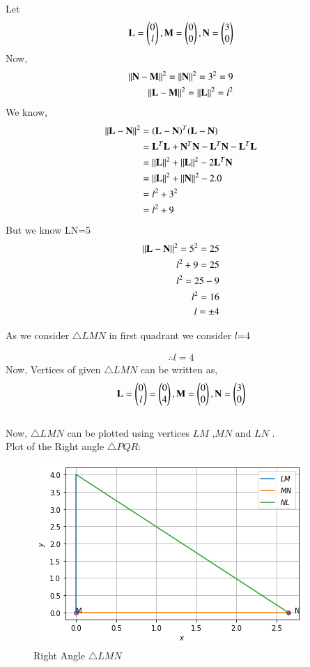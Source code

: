 \documentclass[journal,12pt,twocolumn]{IEEEtran}
\begin{document}
Let
\begin{align}
\textbf{L}=\begin{pmatrix}0 \\ l\end{pmatrix},
\textbf{M}=\begin{pmatrix}0 \\ 0\end{pmatrix} ,
\textbf{N}=\begin{pmatrix}3 \\ 0\end{pmatrix}
\end{align}
Now,
\begin{align}
\left\lVert\mathbf{N}-\mathbf{M}\right\rVert^2 = \left\lVert\mathbf{N}\right\rVert^2  = 3^2 =9
\\
\left\lVert\mathbf{L}-\mathbf{M}\right\rVert^2 = \left\lVert\mathbf{L}\right\rVert^2 =l^2
\end{align}
We know,
\begin{align}
\left\lVert\mathbf{L}-\mathbf{N}\right\rVert^2 &= ({\mathbf{L}-\mathbf{N}})^T({\mathbf{L}-\mathbf{N}})
\\
&= \mathbf{L}^T\mathbf{L}+\mathbf{N}^T\mathbf{N}-\mathbf{L}^T\mathbf{N} - \mathbf{L}^T\mathbf{L}
\\
&= \left\lVert\mathbf{L}\right\rVert^2 + \left\lVert\mathbf{L}\right\rVert^2 - 2\mathbf{L}^T\mathbf{N}
\\
&= \left\lVert\mathbf{L}\right\rVert^2 + \left\lVert\mathbf{N}\right\rVert^2-2.0
\\
&= l^2 + 3^2
\\
&=l^2+9
\end{align}
But we know LN=5 
\begin{align}
\left\lVert{\mathbf{L}-\mathbf{N}}\right\rVert^2=5^2=25
\\
l^2+9=25
\\
l^2=25-9
\\
l^2=16
\\
l=\pm4
\end{align}

As we consider $\triangle LMN$  in first quadrant we consider $l$=4

\begin{align}
\therefore l=4
\end{align}
Now, Vertices of given $\triangle LMN$ can be written as,
\begin{align}
\mathbf{L} = \begin{pmatrix}0\\l\end{pmatrix}=\begin{pmatrix}0\\4\end{pmatrix}, \mathbf{M} = \begin{pmatrix}0\\0\end{pmatrix}, \mathbf{N} = \begin{pmatrix}3\\0\end{pmatrix}
\end{align}
\\
 Now, $\triangle LMN$ can be plotted using vertices $LM$ ,$MN$ and $LN$ .
\\

Plot of the Right angle $\triangle PQR$:

\begin{figure}[ht]
    \centering
    \includegraphics[width=\columnwidth]{RIGHTTRIANGLE-1.png}
    \caption{Right Angle $\triangle LMN$}
    \label{fig:Right Angle $\triangle LMN$}
\end{figure}
\end{document}

